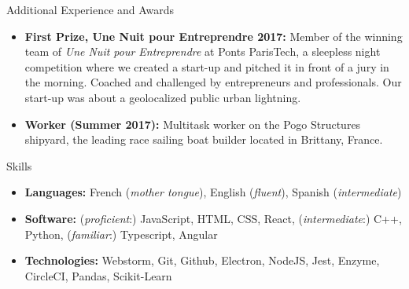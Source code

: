 \documentclass[]{mcdowellcv}
\begin{document}
    \begin{cvsection}{Additional Experience and Awards}
        \begin{cvsubsection}{}{}{}
            \begin{itemize}

                \item \textbf{First Prize, Une Nuit pour Entreprendre 2017:} Member of the winning team of \textit{Une Nuit pour Entreprendre} at Ponts ParisTech, a sleepless
                night competition where we created a start-up and pitched it in front of a jury in the morning.
                Coached and challenged by entrepreneurs and professionals.
                Our start-up was about a geolocalized public urban lightning.

                \item \textbf{Worker (Summer 2017):} Multitask worker on the Pogo Structures shipyard, the leading race sailing boat builder located in Brittany, France.

            \end{itemize}
        \end{cvsubsection}
    \end{cvsection}

    \begin{cvsection}{Skills}
        \begin{cvsubsection}{}{}{}
            \begin{itemize}
                \item \textbf{Languages:} French (\textit{mother tongue}), English (\textit{fluent}), Spanish (\textit{intermediate})
                \item \textbf{Software:} (\textit{proficient}:) JavaScript, HTML, CSS, React, (\textit{intermediate}:) C++, Python, (\textit{familiar}:) Typescript, Angular
                \item \textbf{Technologies:} Webstorm, Git, Github, Electron, NodeJS, Jest, Enzyme, CircleCI, Pandas, Scikit-Learn
            \end{itemize}
        \end{cvsubsection}
    \end{cvsection}
\end{document}
